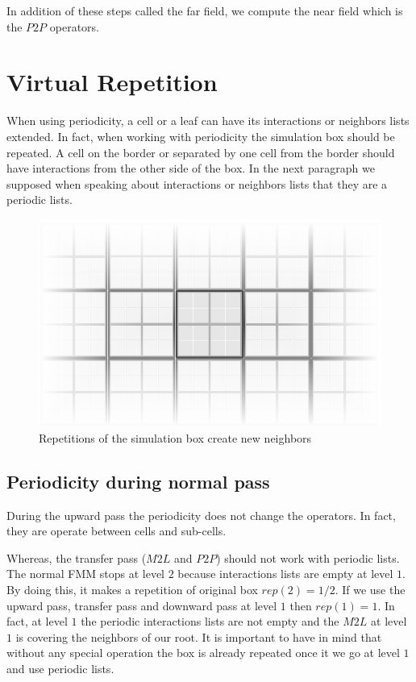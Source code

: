 \documentclass[12pt]{article} %
\begin{document}
In addition of these steps called the far field, we compute the near field which is the $P2P$ operators.


\section{Virtual Repetition}

When using periodicity, a cell or a leaf can have its interactions or neighbors lists extended.
In fact, when working with periodicity the simulation box should be repeated.
A cell on the border or separated by one cell from the border should have interactions from the other side of the box.
In the next paragraph we supposed when speaking about interactions or neighbors lists that they are a periodic lists.

\begin{figure}[h]
\centering
\includegraphics[scale=0.6]{Images/Repetitions}
\caption{Repetitions of the simulation box create new neighbors}
\end{figure}

\subsection{Periodicity during normal pass}
During the upward pass the periodicity does not change the operators.
In fact, they are operate between cells and sub-cells.

Whereas, the transfer pass ($M2L$ and $P2P$) should not work with periodic lists.
The normal FMM stops at level $2$ because interactions lists are empty at level $1$.
By doing this, it makes a repetition of original box $rep(2) = 1/2$.
If we use the upward pass, transfer pass and downward pass at level $1$ then $rep(1) = 1$.
In fact, at level $1$ the periodic interactions lists are not empty and the $M2L$ at level $1$ is covering the neighbors of our root.
It is important to have in mind that without any special operation the box is already repeated once it we go at level $1$ and use periodic lists.
\end{document}
